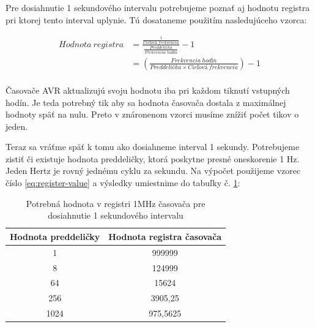 Pre dosiahnutie 1 sekundového intervalu potrebujeme poznať aj hodnotu registra
pri ktorej tento interval uplynie. Tú dosataneme použitím nasledujúceho vzorca:

\begin{equation} \label{eq:register-value}
    \begin{aligned}
        Hodnota\:registra & = \frac{ \frac{1}{Cieľová\:frekvencia}} { \frac{Preddelička}{Frekvencia\:hodín}} - 1 \\
                          & = (\frac{Frekvencia\:hodín}{Preddelička \times Cieľová\:frekvencia}) - 1             \\
    \end{aligned}
\end{equation}

Časovače AVR aktualizujú svoju hodnotu iba pri každom tiknutí vstupných hodín.
Je teda potrebný tik aby sa hodnota časovača dostala z maximálnej hodnoty späť na nulu. Preto v znáronenom vzorci
musíme znížiť počet tikov o jeden. \par

Teraz sa vráťme späť k tomu ako dosiahneme interval 1 sekundy.
Potrebujeme zistiť či existuje hodnota preddeličky, ktorá poskytne presné oneskorenie 1 Hz. Jeden Hertz je rovný jednému cyklu za sekundu. Na výpočet použijeme vzorec
číslo \ref{eq:register-value} a výsledky umiestnime do tabuľky č. \ref{table:timerPrescalerValues}:

\begin{table}[!htbp]
    \begin{center}
        \begin{tabular}{|c|c|}
            \hline
            Hodnota preddeličky & Hodnota registra časovača \\
            \hline
            1                   & 999999                    \\
            8                   & 124999                    \\
            64                  & 15624                     \\
            256                 & 3905,25                   \\
            1024                & 975,5625                  \\
            \hline
        \end{tabular}
        \caption{Potrebná hodnota v registri 1MHz časovača pre dosiahnutie 1 sekundového intervalu}
        \label{table:timerPrescalerValues}
    \end{center}
\end{table}

